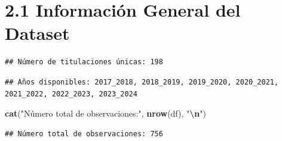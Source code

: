 \documentclass[
]{article}
\newenvironment{Shaded}{\begin{snugshade}}{\end{snugshade}}
\newcommand{\AttributeTok}[1]{\textcolor[rgb]{0.13,0.29,0.53}{#1}}
\newcommand{\FunctionTok}[1]{\textcolor[rgb]{0.13,0.29,0.53}{\textbf{#1}}}
\newcommand{\NormalTok}[1]{#1}
\newcommand{\SpecialCharTok}[1]{\textcolor[rgb]{0.81,0.36,0.00}{\textbf{#1}}}
\newcommand{\StringTok}[1]{\textcolor[rgb]{0.31,0.60,0.02}{#1}}
\begin{document}
\section{2.1 Información General del
Dataset}\label{informaciuxf3n-general-del-dataset}

\begin{Shaded}
\end{Shaded}

\begin{verbatim}
## Número de titulaciones únicas: 198
\end{verbatim}

\begin{Shaded}
\end{Shaded}

\begin{verbatim}
## Años disponibles: 2017_2018, 2018_2019, 2019_2020, 2020_2021, 2021_2022, 2022_2023, 2023_2024
\end{verbatim}

\begin{Shaded}
\begin{Highlighting}[]
\FunctionTok{cat}\NormalTok{(}\StringTok{"Número total de observaciones:"}\NormalTok{, }\FunctionTok{nrow}\NormalTok{(df), }\StringTok{"}\SpecialCharTok{\textbackslash{}n}\StringTok{"}\NormalTok{)}
\end{Highlighting}
\end{Shaded}

\begin{verbatim}
## Número total de observaciones: 756
\end{verbatim}

\begin{Shaded}
\end{Shaded}
\end{document}
